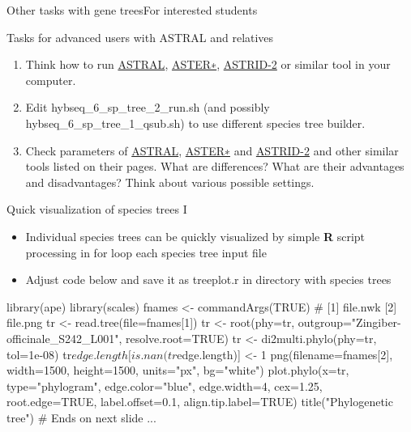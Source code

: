 \documentclass[compress,  xelatex, 11pt, xcolor=x11names, aspectratio=169,
	hyperref={
		bookmarks=true,
		unicode=true,
		colorlinks=true,
		pdftitle={HybSeq course},
		plainpages=false,
		pdfauthor={Vojtech Zeisek},
		pdfsubject={Practical processing of HybSeq target enrichment sequencing data on computing grids like MetaCentrum},
		pdfcreator={XeLaTeX},
		pdfkeywords={BASH, command line, GNU, HybSeq, Linux, MetaCentrum, sequencing shell, target enrichment},
		linkcolor=Turquoise4, %
		anchorcolor=DodgerBlue4, %
		citecolor=DodgerBlue4, %
		filecolor=DodgerBlue4, %
		menucolor=Tan4, %
		urlcolor=DarkOliveGreen4 %
		},
	url={hyphens, lowtilde} %
	]{beamer}
\renewcommand{\texttt}[1]{\colorbox{Cornsilk2}{{\ttfamily #1}}}
\begin{document}
\begin{frame}{Other tasks with gene trees}{For interested students}
	\begin{exampleblock}{Tasks for advanced users with ASTRAL and relatives}
		\begin{enumerate}
			\item Think how to run \href{https://github.com/smirarab/ASTRAL}{ASTRAL}, \href{https://github.com/chaoszhang/ASTER}{ASTER∗}, \href{https://github.com/pranjalv123/ASTRID}{ASTRID-2} or similar tool in your computer.
			\item Edit \texttt{hybseq\_6\_sp\_tree\_2\_run.sh} (and possibly \texttt{hybseq\_6\_sp\_tree\_1\_qsub.sh}) to use different species tree builder.
			\item Check parameters of \href{https://github.com/smirarab/ASTRAL}{ASTRAL}, \href{https://github.com/chaoszhang/ASTER}{ASTER∗} and \href{https://github.com/pranjalv123/ASTRID}{ASTRID-2} and other similar tools listed on their pages. What are differences? What are their advantages and disadvantages? Think about various possible settings.
		\end{enumerate}
	\end{exampleblock}
\end{frame}

\begin{frame}[fragile]{Quick visualization of species trees I}
	\begin{itemize}
		\item Individual species trees can be quickly visualized by simple \textbf{R} script processing in \texttt{for} loop each species tree input file
		\item Adjust code below and save it as \texttt{treeplot.r} in directory  with species trees
	\end{itemize}
	\begin{spluscode}
    library(ape)
    library(scales)
    fnames <- commandArgs(TRUE) # [1] file.nwk [2] file.png
    tr <- read.tree(file=fnames[1])
    tr <- root(phy=tr, outgroup="Zingiber-officinale_S242_L001",
      resolve.root=TRUE)
    tr <- di2multi.phylo(phy=tr, tol=1e-08)
    tr$edge.length[is.nan(tr$edge.length)] <- 1
    png(filename=fnames[2], width=1500, height=1500, units="px", bg="white")
      plot.phylo(x=tr, type="phylogram", edge.color="blue", edge.width=4,
        cex=1.25, root.edge=TRUE, label.offset=0.1, align.tip.label=TRUE)
      title("Phylogenetic tree") # Ends on next slide ...
	\end{spluscode}
\end{frame}
\end{document}
